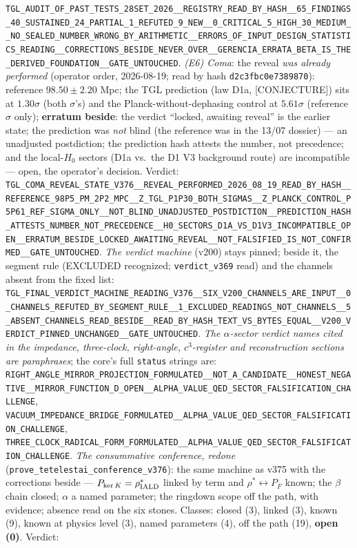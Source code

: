 \documentclass[11pt]{article}
\theoremstyle{definition}\newtheorem{deriv}{Derivation}
\begin{document}
\texttt{TGL\_AUDIT\_OF\_PAST\_TESTS\_28SET\_2026\_\_REGISTRY\_READ\_BY\_HASH\_\_65\_FINDINGS\_40\_SUSTAINED\_24\_PARTIAL\_1\_REFUTED\_9\_NEW\_\_0\_CRITICAL\_5\_HIGH\_30\_MEDIUM\_\_NO\_SEALED\_NUMBER\_WRONG\_BY\_ARITHMETIC\_\_ERRORS\_OF\_INPUT\_DESIGN\_STATISTICS\_READING\_\_CORRECTIONS\_BESIDE\_NEVER\_OVER\_\_GERENCIA\_ERRATA\_BETA\_IS\_THE\_DERIVED\_FOUNDATION\_\_GATE\_UNTOUCHED}. \emph{(E6) Coma}: the reveal \emph{was already performed} (operator order, 2026-08-19; read by hash \texttt{d2c3fbc0e7389870}): reference $98.50\pm2.20$ Mpc; the TGL prediction (law D1a, \textsf{[CONJECTURE]}) sits at $1.30\sigma$ (both $\sigma$'s) and the Planck-without-dephasing control at $5.61\sigma$ (reference $\sigma$ only); \textbf{erratum beside}: the verdict ``locked, awaiting reveal'' is the earlier state; the prediction was \emph{not} blind (the reference was in the 13/07 dossier) --- an unadjusted postdiction; the prediction hash attests the number, not precedence; and the local-$H_0$ sectors (D1a vs.\ the D1 V3 background route) are incompatible --- open, the operator's decision. Verdict: \texttt{TGL\_COMA\_REVEAL\_STATE\_V376\_\_REVEAL\_PERFORMED\_2026\_08\_19\_READ\_BY\_HASH\_\_REFERENCE\_98P5\_PM\_2P2\_MPC\_\_Z\_TGL\_P1P30\_BOTH\_SIGMAS\_\_Z\_PLANCK\_CONTROL\_P5P61\_REF\_SIGMA\_ONLY\_\_NOT\_BLIND\_UNADJUSTED\_POSTDICTION\_\_PREDICTION\_HASH\_ATTESTS\_NUMBER\_NOT\_PRECEDENCE\_\_H0\_SECTORS\_D1A\_VS\_D1V3\_INCOMPATIBLE\_OPEN\_\_ERRATUM\_BESIDE\_LOCKED\_AWAITING\_REVEAL\_\_NOT\_FALSIFIED\_IS\_NOT\_CONFIRMED\_\_GATE\_UNTOUCHED}. \emph{The verdict machine} (v200) stays pinned; beside it, the segment rule (EXCLUDED recognized; \texttt{verdict\_v369} read) and the channels absent from the fixed list: \texttt{TGL\_FINAL\_VERDICT\_MACHINE\_READING\_V376\_\_SIX\_V200\_CHANNELS\_ARE\_INPUT\_\_0\_CHANNELS\_REFUTED\_BY\_SEGMENT\_RULE\_\_1\_EXCLUDED\_READINGS\_NOT\_CHANNELS\_\_5\_ABSENT\_CHANNELS\_READ\_BESIDE\_\_READ\_BY\_HASH\_TEXT\_VS\_BYTES\_EQUAL\_\_V200\_VERDICT\_PINNED\_UNCHANGED\_\_GATE\_UNTOUCHED}. \emph{The $\alpha$-sector verdict names cited in the impedance, three-clock, right-angle, $c^3$-register and reconstruction sections are paraphrases}; the core's full \texttt{status} strings are: \texttt{RIGHT\_ANGLE\_MIRROR\_PROJECTION\_FORMULATED\_\_NOT\_A\_CANDIDATE\_\_HONEST\_NEGATIVE\_\_MIRROR\_FUNCTION\_D\_OPEN\_\_ALPHA\_VALUE\_QED\_SECTOR\_FALSIFICATION\_CHALLENGE}, \texttt{VACUUM\_IMPEDANCE\_BRIDGE\_FORMULATED\_\_ALPHA\_VALUE\_QED\_SECTOR\_FALSIFICATION\_CHALLENGE}, \texttt{THREE\_CLOCK\_RADICAL\_FORM\_FORMULATED\_\_ALPHA\_VALUE\_QED\_SECTOR\_FALSIFICATION\_CHALLENGE}. \emph{The consummative conference, redone} (\texttt{prove\_tetelestai\_conference\_v376}): the same machine as v375 with the corrections beside --- $P_{\ker K}=\rho^\ast_{\rm IALD}$ linked by term and $\rho^\ast\leftrightarrow P_F$ known; the $\beta$ chain closed; $\alpha$ a named parameter; the ringdown scope off the path, with evidence; absence read on the six stones. Classes: closed (3), linked (3), known (9), known at physics level (3), named parameters (4), off the path (19), \textbf{open (0)}. Verdict: 
\end{document}
